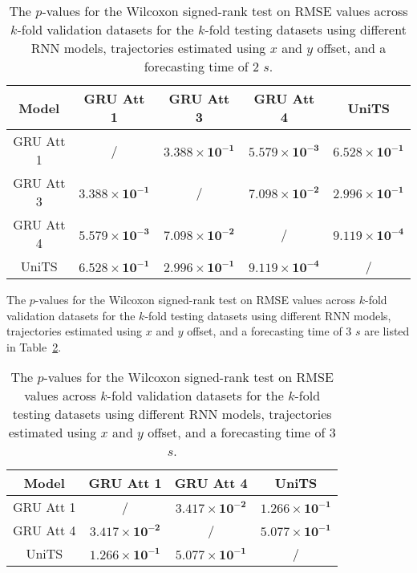 \begin{table}[!ht]
	\centering
	\begin{tabular}{|c|c|c|c|c|}
		\hline
		Model & GRU Att 1 & GRU Att 3 & GRU Att 4 & UniTS \\ \hline
		GRU Att 1 & / & $\mathbf{3.388 \times 10^{-1}}$ & $\mathbf{5.579 \times 10^{-3}}$ & $\mathbf{6.528 \times 10^{-1}}$ \\ \hline
		GRU Att 3 & $\mathbf{3.388 \times 10^{-1}}$ & / & $\mathbf{7.098 \times 10^{-2}}$ & $\mathbf{2.996 \times 10^{-1}}$ \\ \hline
		GRU Att 4 & $\mathbf{5.579 \times 10^{-3}}$ & $\mathbf{7.098 \times 10^{-2}}$ & / & $\mathbf{9.119 \times 10^{-4}}$ \\ \hline
		UniTS & $\mathbf{6.528 \times 10^{-1}}$ & $\mathbf{2.996 \times 10^{-1}}$ & $\mathbf{9.119 \times 10^{-4}}$ & / \\ \hline
	\end{tabular}
	\caption{The $p$-values for the Wilcoxon signed-rank test on RMSE values across $k$-fold validation datasets for the $k$-fold testing datasets using different RNN models, trajectories estimated using $x$ and $y$ offset, and a forecasting time of $2$ $s$.}
	\label{tab:RMSE:no:abs:p:2}
\end{table}

The $p$-values for the Wilcoxon signed-rank test on RMSE values across $k$-fold validation datasets for the $k$-fold testing datasets using different RNN models, trajectories estimated using $x$ and $y$ offset, and a forecasting time of $3$ $s$ are listed in Table~\ref{tab:RMSE:no:abs:p:3}.

\begin{table}[!ht]
	\centering
	\begin{tabular}{|c|c|c|c|}
		\hline
		Model & GRU Att 1 & GRU Att 4 & UniTS \\ \hline
		GRU Att 1 & / & $\mathbf{3.417 \times 10^{-2}}$ & $\mathbf{1.266 \times 10^{-1}}$ \\ \hline
		GRU Att 4 & $\mathbf{3.417 \times 10^{-2}}$ & / & $\mathbf{5.077 \times 10^{-1}}$ \\ \hline
		UniTS & $\mathbf{1.266 \times 10^{-1}}$ & $\mathbf{5.077 \times 10^{-1}}$ & / \\ \hline
	\end{tabular}
	\caption{The $p$-values for the Wilcoxon signed-rank test on RMSE values across $k$-fold validation datasets for the $k$-fold testing datasets using different RNN models, trajectories estimated using $x$ and $y$ offset, and a forecasting time of $3$ $s$.}
	\label{tab:RMSE:no:abs:p:3}
\end{table}

